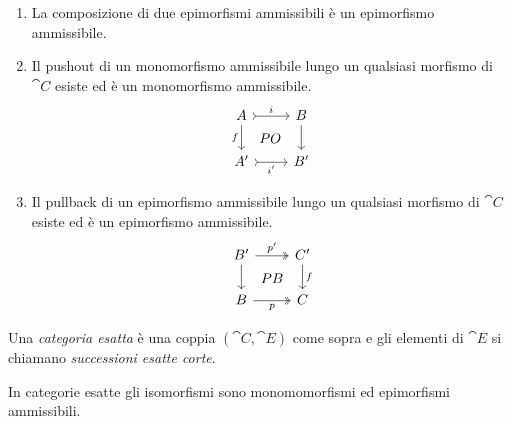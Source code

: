 \begin{definition}
\begin{enumerate}[leftmargin=*, label=(E\arabic*),
    ref=(E\arabic*)]
  \item \label{item:E1op} La composizione di due epimorfismi ammissibili
    è un epimorfismo ammissibile.
  \item \label{item:E2} Il pushout di un monomorfismo ammissibile lungo
    un qualsiasi morfismo di \(\cat C\) esiste ed è un monomorfismo
    ammissibile.
    \[
      \begin{tikzcd}
        A \ar["{f}", d, swap] \ar["{PO}" description, dr, phantom] \ar["{i}", rightarrowtail, r] & B \ar["{}", d] \\
        A' \ar["{i'}", rightarrowtail, r, swap] & B'
      \end{tikzcd}
    \]
  \item \label{item:E2op} Il pullback di un epimorfismo ammissibile
    lungo un qualsiasi morfismo di \(\cat C\) esiste ed è un epimorfismo
    ammissibile.
    \[
      \begin{tikzcd}
        B' \ar["{}", d] \ar["{PB}" description, dr, phantom] \ar["{p'}", twoheadrightarrow, r] & C' \ar["{f}", d] \\
        B \ar["{p}", twoheadrightarrow, r, swap] & C
      \end{tikzcd}
    \]
  \end{enumerate}
  Una {\em categoria esatta} è una coppia \((\cat C,\cat E)\) come sopra
  e gli elementi di \(\cat E\) si chiamano {\em successioni esatte
    corte}.
\end{definition}


\begin{proposition}
  In categorie esatte gli isomorfismi sono monomomorfismi ed epimorfismi
  ammissibili.
\end{proposition}

